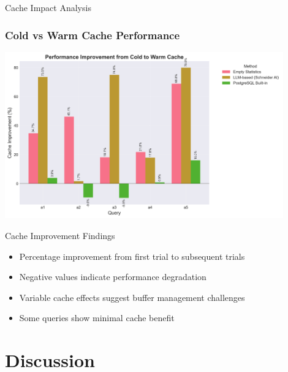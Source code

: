 \documentclass{beamer}
\begin{document}
\begin{frame}{Cache Impact Analysis}
\frametitle{Cold vs Warm Cache Performance}

\begin{center}
\includegraphics[width=0.9\textwidth]{images/cache_improvement_comparison.png}
\end{center}

\begin{exampleblock}{Cache Improvement Findings}
\begin{itemize}
    \item Percentage improvement from first trial to subsequent trials
    \item Negative values indicate performance degradation
    \item Variable cache effects suggest buffer management challenges
    \item Some queries show minimal cache benefit
\end{itemize}
\end{exampleblock}

\end{frame}

\section{Discussion}
\end{document}
